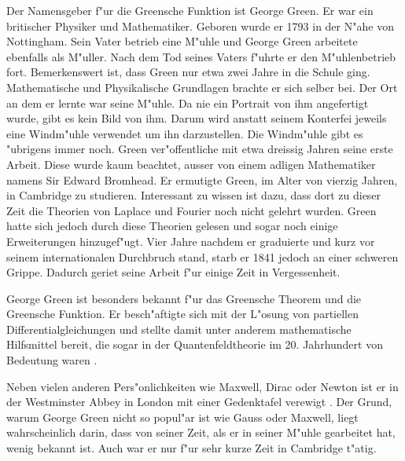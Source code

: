 \begin{refsection}
Der Namensgeber f"ur die Greensche Funktion ist George Green. Er
war ein britischer Physiker und Mathematiker. Geboren wurde er 1793
in der N"ahe von Nottingham. Sein Vater betrieb eine M"uhle und
George Green arbeitete ebenfalls als M"uller. Nach dem Tod seines
Vaters f"uhrte er den M"uhlenbetrieb fort. Bemerkenswert ist, dass
Green nur etwa zwei Jahre in die Schule ging. Mathematische und
Physikalische Grundlagen brachte er sich selber bei. Der Ort an dem
er lernte war seine M"uhle. Da nie ein Portrait von ihm angefertigt
wurde, gibt es kein Bild von ihm. Darum wird anstatt seinem Konterfei
jeweils eine Windm"uhle verwendet um ihn darzustellen. Die Windm"uhle
gibt es "ubrigens immer noch. Green ver"offentliche mit etwa dreissig
Jahren seine erste Arbeit. Diese wurde kaum beachtet, ausser von
einem adligen Mathematiker namens Sir Edward Bromhead. Er ermutigte
Green, im Alter von vierzig Jahren, in Cambridge zu studieren.
Interessant zu wissen ist dazu, dass dort zu dieser Zeit die Theorien
von Laplace und Fourier noch nicht gelehrt wurden. Green hatte sich
jedoch durch diese Theorien gelesen und sogar noch einige Erweiterungen
hinzugef"ugt. Vier Jahre nachdem er graduierte und kurz vor seinem
internationalen Durchbruch stand, starb er 1841 jedoch an einer
schweren Grippe. Dadurch geriet seine Arbeit f"ur einige Zeit in
Vergessenheit.
	
George Green ist besonders bekannt f"ur das Greensche Theorem und
die Greensche Funktion. Er besch"aftigte sich mit der L"osung von
partiellen Differentialgleichungen und stellte damit unter anderem
mathematische Hilfsmittel bereit, die sogar in der Quantenfeldtheorie
im 20. Jahrhundert von Bedeutung waren \cite{wiki:green}.
	
Neben vielen anderen Pers"onlichkeiten wie Maxwell, Dirac oder
Newton ist er in der Westminster Abbey in London mit einer Gedenktafel
verewigt \cite{wiki:westminster}. Der Grund, warum George Green nicht
so popul"ar ist wie Gauss oder Maxwell, liegt wahrscheinlich darin,
dass von seiner Zeit, als er in seiner M"uhle gearbeitet hat, wenig
bekannt ist. Auch war er nur f"ur sehr kurze Zeit in Cambridge
t"atig.


\end{refsection}

